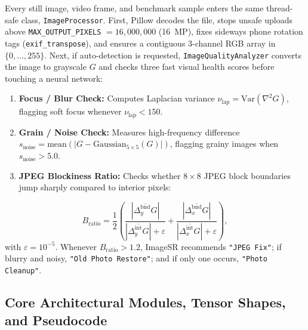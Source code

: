 \documentclass[10pt,onecolumn,journal]{IEEEtran}
\begin{document}
Every still image, video frame, and benchmark sample enters the same thread-safe class, \texttt{ImageProcessor}. First, Pillow decodes the file, stops unsafe uploads above \texttt{MAX\_OUTPUT\_PIXELS} $= 16{,}000{,}000$ (16~MP), fixes sideways phone rotation tags (\texttt{exif\_transpose}), and ensures a contiguous 3-channel RGB array in $\{0, \dots, 255\}$. Next, if auto-detection is requested, \texttt{ImageQualityAnalyzer} converts the image to grayscale $G$ and checks three fast visual health scores before touching a neural network:
\begin{enumerate}
    \item \textbf{Focus / Blur Check:} Computes Laplacian variance $\nu_{\mathrm{lap}} = \mathrm{Var}(\nabla^2 G)$, flagging soft focus whenever $\nu_{\mathrm{lap}} < 150$.
    \item \textbf{Grain / Noise Check:} Measures high-frequency difference $s_{\mathrm{noise}} = \mathrm{mean}(|G - \mathrm{Gaussian}_{5\times5}(G)|)$, flagging grainy images when $s_{\mathrm{noise}} > 5.0$.
    \item \textbf{JPEG Blockiness Ratio:} Checks whether $8\times8$ JPEG block boundaries jump sharply compared to interior pixels:
\end{enumerate}
\begin{equation}
B_{\mathrm{ratio}} = \frac{1}{2}\left(\frac{|\overline{\Delta_y^{\mathrm{bnd}} G}|}{|\overline{\Delta_y^{\mathrm{int}} G}| + \varepsilon} + \frac{|\overline{\Delta_x^{\mathrm{bnd}} G}|}{|\overline{\Delta_x^{\mathrm{int}} G}| + \varepsilon}\right),
\label{eq:blockiness}
\end{equation}
with $\varepsilon = 10^{-5}$. Whenever $B_{\mathrm{ratio}} > 1.2$, ImageSR recommends \texttt{"JPEG Fix"}; if blurry and noisy, \texttt{"Old Photo Restore"}; and if only one occurs, \texttt{"Photo Cleanup"}.

\subsection{Core Architectural Modules, Tensor Shapes, and Pseudocode}
\end{document}

